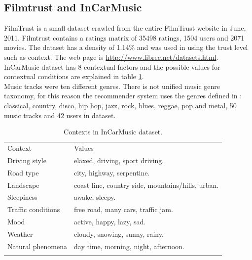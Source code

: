 \subsection{Filmtrust and InCarMusic} 

FilmTrust is a small dataset crawled from the entire FilmTrust website
in June, 2011. Filmtrust contains a ratings matrix of 35498 ratings,
1504  users and 2071 movies. The dataset has a density of 1.14\% and
was used in \cite{guo2013novel} using the trust level such as
context. The web page is \url{http://www.librec.net/datasets.html}.\\ 
InCarMusic dataset\cite{baltrunas2011incarmusic} has 8 
contextual factors and the possible values for contextual conditions 
are explained in table \ref{tab:incarmusic}.\\ 
Music tracks were ten different genres. There is not unified music
genre taxonomy, for this reason the recommender system uses the genres
defined in \cite{tzanetakis2002musical}: classical, country, disco, 
hip hop, jazz, rock, blues, reggae, pop and metal, 50 music tracks 
and 42 users in dataset.
\begin{table}
\centering
\small
\captionsetup{font=footnotesize}
\caption{Contexts in InCarMusic dataset.}
\label{tab:incarmusic}   
\begin{tabular}{ll}
\hline\noalign{\smallskip}
Context  			& Values \\
\noalign{\smallskip}\hline\noalign{\smallskip}
Driving style 		&  elaxed, driving, sport driving.   \\
Road type 			&  city, highway, serpentine. \\
Landscape 			& coast line, country side, mountains/hills, urban.\\
Sleepiness 			& awake, sleepy. \\
Traffic conditions 	& free road, many cars, traffic jam. \\
Mood 				& active, happy, lazy, sad. \\
Weather 			& cloudy, snowing, sunny, rainy. \\
Natural phenomena 	& day time, morning, night, afternoon. \\
\noalign{\smallskip}\hline
\end{tabular}
\end{table}

